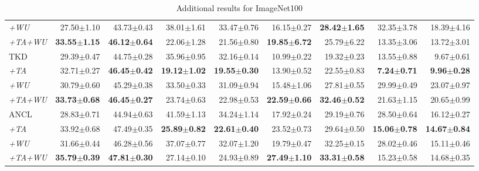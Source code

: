 \begin{appendix}
\begin{table*}[!th]
{\begin{tabular}{@{}lrrrrrrrr@{}}
\textit{+WU} &
  27.50$\pm$1.10 &
  43.73$\pm$0.43 &
  38.01$\pm$1.61 &
  33.47$\pm$0.76 &
  16.15$\pm$0.27 &
  \textbf{28.42$\pm$1.65} &
  32.35$\pm$3.78 &
  18.39$\pm$4.16 \\
\textit{+TA+WU} &
  \textbf{33.55$\pm$1.15} &
  \textbf{46.12$\pm$0.64} &
  22.06$\pm$1.28 &
  21.56$\pm$0.80 &
  \textbf{19.85$\pm$6.72} &
  25.79$\pm$6.22 &
  13.35$\pm$3.06 &
  13.72$\pm$3.01 \\ \midrule
TKD &
  29.39$\pm$0.47 &
  44.75$\pm$0.28 &
  35.96$\pm$0.95 &
  32.16$\pm$0.14 &
  10.99$\pm$0.22 &
  19.32$\pm$0.23 &
  13.55$\pm$0.88 &
  9.67$\pm$0.61 \\
\textit{+TA} &
  32.71$\pm$0.27 &
  \textbf{46.45$\pm$0.42} &
  \textbf{19.12$\pm$1.02} &
  \textbf{19.55$\pm$0.30} &
  13.90$\pm$0.52 &
  22.55$\pm$0.83 &
  \textbf{7.24$\pm$0.71} &
  \textbf{9.96$\pm$0.28} \\
\textit{+WU} &
  30.79$\pm$0.60 &
  45.29$\pm$0.38 &
  33.50$\pm$0.33 &
  31.09$\pm$0.94 &
  15.48$\pm$1.06 &
  27.81$\pm$0.55 &
  29.99$\pm$0.49 &
  23.07$\pm$0.97 \\
\textit{+TA+WU} &
  \textbf{33.73$\pm$0.68} &
  \textbf{46.45$\pm$0.27} &
  23.74$\pm$0.63 &
  22.98$\pm$0.53 &
  \textbf{22.59$\pm$0.66} &
  \textbf{32.46$\pm$0.52} &
  21.63$\pm$1.15 &
  20.65$\pm$0.99 \\ \midrule
ANCL &
  28.83$\pm$0.71 &
  44.94$\pm$0.63 &
  41.59$\pm$1.13 &
  34.24$\pm$1.14 &
  17.92$\pm$0.24 &
  29.19$\pm$0.76 &
  28.50$\pm$0.64 &
  16.12$\pm$0.27 \\
\textit{+TA} &
  33.92$\pm$0.68 &
  47.49$\pm$0.35 &
  \textbf{25.89$\pm$0.82} &
  \textbf{22.61$\pm$0.40} &
  23.52$\pm$0.73 &
  29.64$\pm$0.50 &
  \textbf{15.06$\pm$0.78} &
  \textbf{14.67$\pm$0.84} \\
\textit{+WU} &
  31.66$\pm$0.44 &
  46.28$\pm$0.56 &
  37.07$\pm$0.77 &
  32.07$\pm$1.20 &
  19.79$\pm$0.47 &
  32.25$\pm$0.15 &
  28.02$\pm$0.46 &
  15.11$\pm$0.46 \\
\textit{+TA+WU} &
  \textbf{35.79$\pm$0.39} &
  \textbf{47.81$\pm$0.30} &
  27.14$\pm$0.10 &
  24.93$\pm$0.89 &
  \textbf{27.49$\pm$1.10} &
  \textbf{33.31$\pm$0.58} &
  15.23$\pm$0.58 &
  14.68$\pm$0.35 \\
  \bottomrule
\end{tabular}%
}
\caption{Additional results for ImageNet100}
\label{tab:app:imagenet100}
\end{table*}





\end{appendix}
